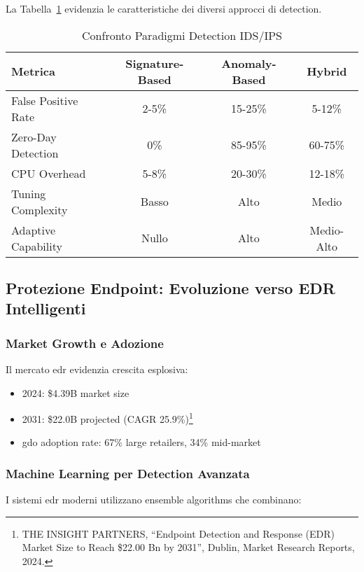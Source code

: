 La Tabella~\ref{tab:confronto-paradigmi-detection} evidenzia le caratteristiche dei diversi approcci di detection.

\begin{table}[htbp]
\centering
\caption{Confronto Paradigmi Detection IDS/IPS}
\label{tab:confronto-paradigmi-detection}
\begin{tabular}{|l|c|c|c|}
\hline
\textbf{Metrica} & \textbf{Signature-Based} & \textbf{Anomaly-Based} & \textbf{Hybrid} \\
\hline
False Positive Rate & 2-5\% & 15-25\% & 5-12\% \\
\hline
Zero-Day Detection & 0\% & 85-95\% & 60-75\% \\
\hline
CPU Overhead & 5-8\% & 20-30\% & 12-18\% \\
\hline
Tuning Complexity & Basso & Alto & Medio \\
\hline
Adaptive Capability & Nullo & Alto & Medio-Alto \\
\hline
\end{tabular}
\end{table}

\subsection{Protezione Endpoint: Evoluzione verso EDR Intelligenti}
\label{subsec:protezione-endpoint}

\subsubsection{Market Growth e Adozione}

Il mercato \gls{edr} evidenzia crescita esplosiva:
\begin{itemize}
    \item 2024: \$4.39B market size
    \item 2031: \$22.0B projected (CAGR 25.9\%)\footnote{THE INSIGHT PARTNERS, ``Endpoint Detection and Response (EDR) Market Size to Reach \$22.00 Bn by 2031'', Dublin, Market Research Reports, 2024.}
    \item \gls{gdo} adoption rate: 67\% large retailers, 34\% mid-market
\end{itemize}

\subsubsection{Machine Learning per Detection Avanzata}

I sistemi \gls{edr} moderni utilizzano ensemble algorithms che combinano:

